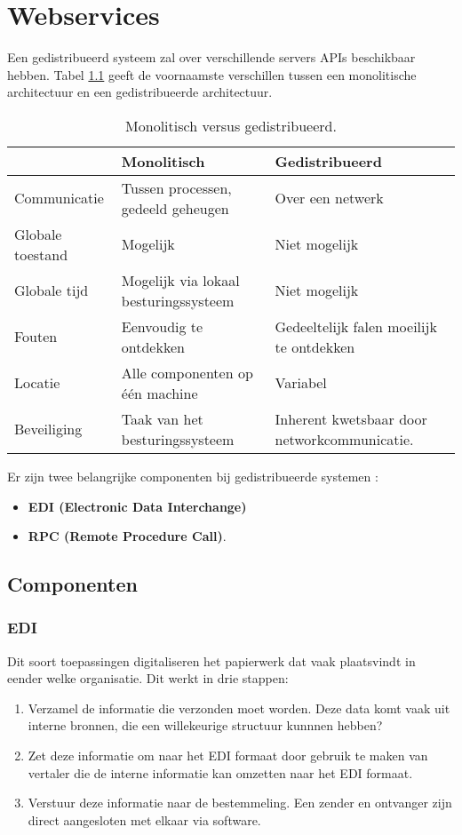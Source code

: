 \documentclass{report}
\begin{document}
\chapter{Webservices}
Een gedistribueerd systeem zal over verschillende servers APIs beschikbaar hebben. Tabel \ref{table:mono_vs_distributed} geeft de voornaamste verschillen tussen een monolitische architectuur en een gedistribueerde architectuur.
\begin{table}[ht]
	\begin{tabular}{l | l | l}
		& Monolitisch & Gedistribueerd \\
		\hline
		Communicatie & Tussen processen, gedeeld geheugen & Over een netwerk \\
		Globale toestand & Mogelijk & Niet mogelijk \\
		Globale tijd & Mogelijk via lokaal besturingssysteem & Niet mogelijk \\
		Fouten & Eenvoudig te ontdekken & Gedeeltelijk falen moeilijk te ontdekken \\
		Locatie & Alle componenten op één machine & Variabel \\
		Beveiliging & Taak van het besturingssysteem & Inherent kwetsbaar door networkcommunicatie.
	\end{tabular}
	\caption{Monolitisch versus gedistribueerd.}
	\label{table:mono_vs_distributed}
\end{table}

Er zijn twee belangrijke componenten bij gedistribueerde systemen :
\begin{itemize}
	\item \textbf{EDI  (Electronic Data Interchange)}
	\item \textbf{RPC (Remote Procedure Call)}.
\end{itemize}
 
\section{Componenten}
\subsection{EDI}
Dit soort toepassingen digitaliseren het papierwerk dat vaak plaatsvindt in eender welke organisatie. Dit werkt in drie stappen:
\begin{enumerate}
	\item Verzamel de informatie die verzonden moet worden. Deze data komt vaak uit interne bronnen, die een willekeurige structuur kunnnen hebben?
	\item Zet deze informatie om naar het EDI formaat door gebruik te maken van vertaler die de interne informatie kan omzetten naar het EDI formaat.
	\item Verstuur deze informatie naar de bestemmeling. Een zender en ontvanger zijn direct aangesloten met elkaar via software.
\end{enumerate}
\end{document}
